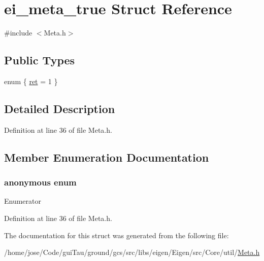 \hypertarget{structei__meta__true}{\section{ei\-\_\-meta\-\_\-true Struct Reference}
\label{structei__meta__true}
}


{\ttfamily \#include $<$Meta.\-h$>$}

\subsection*{Public Types}
\begin{DoxyCompactItemize}
\item 
enum \{ \hyperlink{structei__meta__true_a04b01dd70aece3bc28724efd0ab794aead3abfe2010bb9bdb5bfc195a41c1e0a3}{ret} = 1
 \}
\end{DoxyCompactItemize}


\subsection{Detailed Description}


Definition at line 36 of file Meta.\-h.



\subsection{Member Enumeration Documentation}
\hypertarget{structei__meta__true_a04b01dd70aece3bc28724efd0ab794ae}{\subsubsection[{anonymous enum}]{\setlength{\rightskip}{0pt plus 5cm}anonymous enum}}\label{structei__meta__true_a04b01dd70aece3bc28724efd0ab794ae}
\begin{Desc}
\item[Enumerator]\par
\begin{description}
\item[{\em 
\hypertarget{structei__meta__true_a04b01dd70aece3bc28724efd0ab794aead3abfe2010bb9bdb5bfc195a41c1e0a3}{ret}\label{structei__meta__true_a04b01dd70aece3bc28724efd0ab794aead3abfe2010bb9bdb5bfc195a41c1e0a3}
}]\end{description}
\end{Desc}


Definition at line 36 of file Meta.\-h.



The documentation for this struct was generated from the following file\-:\begin{DoxyCompactItemize}
\item 
/home/jose/\-Code/gui\-Tau/ground/gcs/src/libs/eigen/\-Eigen/src/\-Core/util/\hyperlink{_meta_8h}{Meta.\-h}\end{DoxyCompactItemize}
